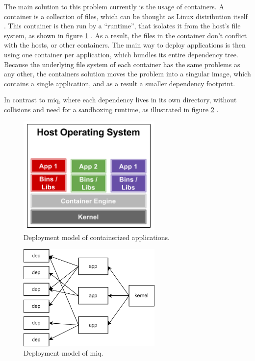 The main solution to this problem currently is the usage of containers. A
container is a collection of files, which can be thought as Linux distribution
itself \cite{DockerAcceleratedContainerized2022} \cite{merkelDockerLightweightLinux2014}. This container is then run by a ``runtime'', that isolates it from the
host's file system, as shown in figure \ref{fig:graph5} . As a result, the files in the container don't conflict with
the hosts, or other containers. The main way to deploy applications is then
using one container per application, which bundles its entire dependency tree.
Because the underlying file system of each container has the same problems as any
other, the containers solution moves the problem into a singular image, which
contains a single application, and as a result a smaller dependency footprint.

In contrast to miq, where each dependency lives in its own directory, without
collisions and need for a sandboxing runtime, as illustrated in figure
\ref{fig:graph6} .

\begin{figure}[hbt]
    \centering
    \includegraphics[width=200pt]{Screenshot 2023-05-29 173501.png}
    \caption{Deployment model of containerized applications.}
    \label{fig:graph5}
\end{figure}

\begin{figure}[hbt]
    \centering
    \includegraphics[width=200pt]{dep2.png}
    \caption{Deployment model of miq.}
    \label{fig:graph6}
\end{figure}


